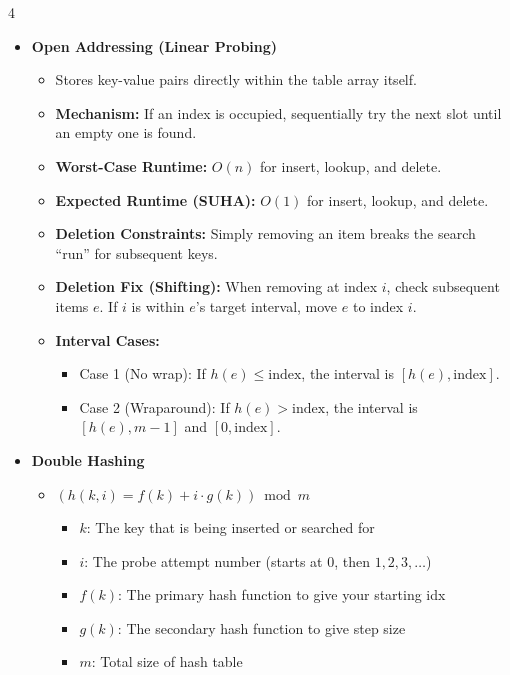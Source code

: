 \documentclass[fontsize=6pt, landscape, a4paper]{scrartcl}
\begin{document}
\begin{multicols*}{4}
\begin{itemize}
        \item \textbf{Open Addressing (Linear Probing)}
              \begin{itemize}
                  \item Stores key-value pairs directly within the table array itself.
                  \item \textbf{Mechanism:} If an index is occupied, sequentially try the next slot until an empty one is found.
                  \item \textbf{Worst-Case Runtime:} $O(n)$ for insert, lookup, and delete.
                  \item \textbf{Expected Runtime (SUHA):} $O(1)$ for insert, lookup, and delete.
                  \item \textbf{Deletion Constraints:} Simply removing an item breaks the search ``run'' for subsequent keys.
                  \item \textbf{Deletion Fix (Shifting):} When removing at index $i$, check subsequent items $e$. If $i$ is within $e$'s target interval, move $e$ to index $i$.
                  \item \textbf{Interval Cases:}
                        \begin{itemize}
                            \item Case 1 (No wrap): If $h(e) \leq \text{index}$, the interval is $[h(e),
                                              \text{index}]$.
                            \item Case 2 (Wraparound): If $h(e) > \text{index}$, the interval is $[h(e), m - 1]$
                                  and $[0, \text{index}]$.
                        \end{itemize}
              \end{itemize}

        \item \textbf{Double Hashing}
              \begin{itemize}
                  \item $(h(k, i) = f(k) + i \cdot g(k)) \bmod m$
                        \begin{itemize}
                            \item $k$: The key that is being inserted or searched for
                            \item $i$: The probe attempt number (starts at $0$, then $1, 2, 3, \dots$)
                            \item $f(k)$: The primary hash function to give your starting idx
                            \item $g(k)$: The secondary hash function to give step size
                            \item $m$: Total size of hash table
                        \end{itemize}
              \end{itemize}
    \end{itemize}


\end{multicols*}
\end{document}
